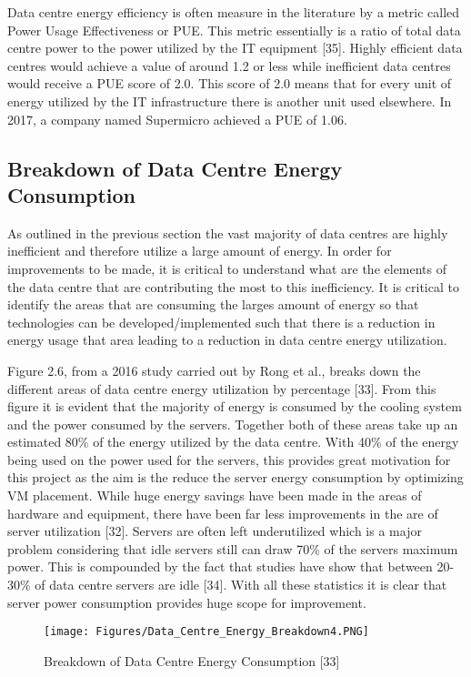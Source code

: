 \documentclass[oneside,12pt]{Classes/RoboticsLaTeX}
\begin{document}
Data centre energy efficiency is often measure in the literature by a metric called Power Usage Effectiveness or PUE. This metric essentially is a ratio of total data centre power to the power utilized by the IT equipment [35]. Highly efficient data centres would achieve a value of around 1.2 or less while inefficient data centres would receive a PUE score of 2.0. This score of 2.0 means that for every unit of energy utilized by the IT infrastructure there is another unit used elsewhere. In 2017, a company named Supermicro achieved a PUE of 1.06.  


\subsection{Breakdown of Data Centre Energy Consumption}
As outlined in the previous section the vast majority of data centres are highly inefficient and therefore utilize a large amount of energy. In order for improvements to be made, it is critical to understand what are the elements of the data centre that are contributing the most to this inefficiency. It is critical to identify the areas that are consuming the larges amount of energy so that technologies can be developed/implemented such that there is a reduction in energy usage that area leading to a reduction in data centre energy utilization. 

Figure 2.6, from a 2016 study carried out by Rong et al., breaks down the different areas of data centre energy utilization by percentage [33]. From this figure it is evident that the majority of energy is consumed by the cooling system and the power consumed by the servers. Together both of these areas take up an estimated 80\% of the energy utilized by the data centre. With 40\% of the energy being used on the power used for the servers, this provides great motivation for this project as the aim is the reduce the server energy consumption by optimizing VM placement. While huge energy savings have been made in the areas of hardware and equipment, there have been far less improvements in the are of server utilization [32]. Servers are often left underutilized which is a major problem considering that idle servers still can draw 70\% of the servers maximum power. This is compounded by the fact that studies have show that between 20-30\% of data centre servers are idle [34]. With all these statistics it is clear that server power consumption provides huge scope for improvement. 

\begin{figure}[h]
\centering
\texttt{[image: Figures/Data\_Centre\_Energy\_Breakdown4.PNG]}
\caption{Breakdown of Data Centre Energy Consumption [33]}
\end{figure}
\end{document}
